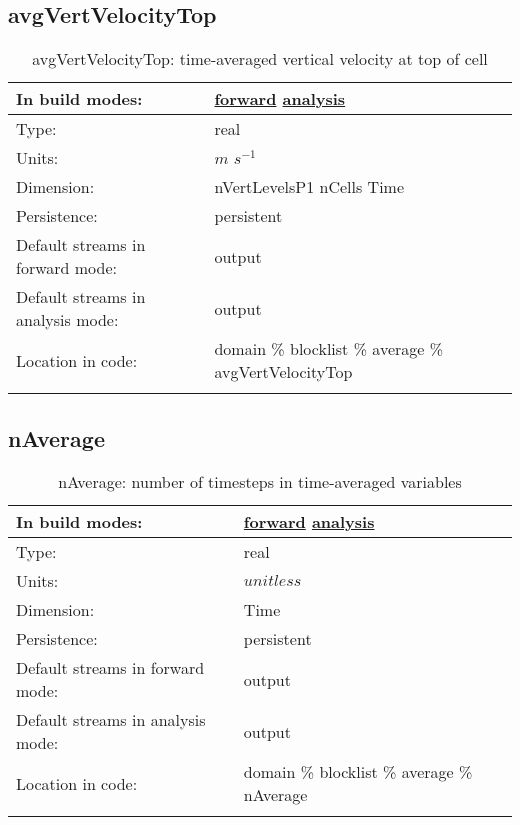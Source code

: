 \subsection[avgVertVelocityTop]{avgVertVelocityTop}
\label{subsec:var_sec_average_avgVertVelocityTop}
\begin{center}
\begin{longtable}{| p{2.0in} | p{4.0in} |}
        \hline 
        In build modes: & \hyperref[subsec:forward_var_tab_average]{forward} \hyperref[subsec:analysis_var_tab_average]{analysis} \\
        \hline 
        Type: & real \\
        \hline 
        Units: & $m$ $s^{-1}$ \\
        \hline 
        Dimension: & nVertLevelsP1 nCells Time \\
        \hline 
        Persistence: & persistent \\
        \hline 
		 Default streams in forward mode: &  output \\
        \hline 
		 Default streams in analysis mode: &  output \\
        \hline 
		 Location in code: & domain \% blocklist \% average \% avgVertVelocityTop \\
		 \hline 
    \caption{avgVertVelocityTop: time-averaged vertical velocity at top of cell}
\end{longtable}
\end{center}
\subsection[nAverage]{nAverage}
\label{subsec:var_sec_average_nAverage}
\begin{center}
\begin{longtable}{| p{2.0in} | p{4.0in} |}
        \hline 
        In build modes: & \hyperref[subsec:forward_var_tab_average]{forward} \hyperref[subsec:analysis_var_tab_average]{analysis} \\
        \hline 
        Type: & real \\
        \hline 
        Units: & $unitless$ \\
        \hline 
        Dimension: & Time \\
        \hline 
        Persistence: & persistent \\
        \hline 
		 Default streams in forward mode: &  output \\
        \hline 
		 Default streams in analysis mode: &  output \\
        \hline 
		 Location in code: & domain \% blocklist \% average \% nAverage \\
		 \hline 
    \caption{nAverage: number of timesteps in time-averaged variables}
\end{longtable}
\end{center}
